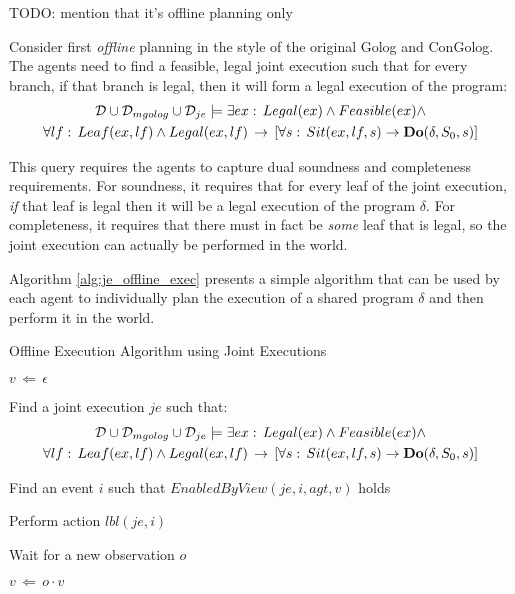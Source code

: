 TODO: mention that it's offline planning only

Consider first \emph{offline} planning in the style of the original
Golog and ConGolog. The agents need to find a feasible, legal joint
execution such that for every branch, if that branch is legal, then
it will form a legal execution of the program:\begin{multline*}
\mathcal{D}\cup\mathcal{D}_{mgolog}\cup\mathcal{D}_{je}\models\exists ex:\, Legal(ex)\wedge Feasible(ex)\wedge\\
\forall lf:\, Leaf(ex,lf)\wedge Legal(ex,lf)\,\rightarrow\,\left[\forall s:\, Sit(ex,lf,s)\rightarrow\mathbf{Do}(\delta,S_{0},s)\right]\end{multline*}


This query requires the agents to capture dual soundness and completeness
requirements. For soundness, it requires that for every leaf of the
joint execution, \emph{if} that leaf is legal then it will be a legal
execution of the program $\delta$. For completeness, it requires
that there must in fact be \emph{some} leaf that is legal, so the
joint execution can actually be performed in the world.

Algorithm \ref{alg:je_offline_exec} presents a simple algorithm that
can be used by each agent to individually plan the execution of a
shared program $\delta$ and then perform it in the world.

%
\begin{algorithm}[t]
 

\caption{Offline Execution Algorithm using Joint Executions}


\label{alg:je_offline_exec} \begin{algorithmic}

\STATE

\STATE $v\,\Leftarrow\,\epsilon$

\STATE Find a joint execution $je$ such that:\begin{multline*}
\mathcal{D}\cup\mathcal{D}_{mgolog}\cup\mathcal{D}_{je}\models\exists ex:\, Legal(ex)\wedge Feasible(ex)\wedge\\
\forall lf:\, Leaf(ex,lf)\wedge Legal(ex,lf)\,\rightarrow\,\left[\forall s:\, Sit(ex,lf,s)\rightarrow\mathbf{Do}(\delta,S_{0},s)\right]\end{multline*}



\STATE Find an event $i$ such that $EnabledByView(je,i,agt,v)$
holds


\STATE Perform action $lbl(je,i)$

\ENDIF

\STATE Wait for a new observation $o$

\STATE $v\,\Leftarrow\, o\cdot v$

\ENDWHILE

\end{algorithmic} 
\end{algorithm}



